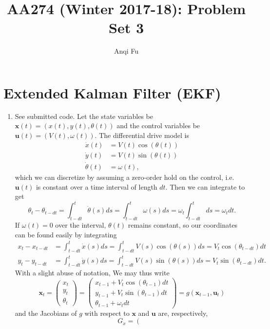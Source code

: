 \documentclass[12pt]{article}
\title{\Large{AA274 (Winter 2017-18): Problem Set 3}}
\author{Anqi Fu}
\begin{document}
\maketitle

\section{Extended Kalman Filter (EKF)}
\begin{enumerate}
	\item See submitted code. Let the state variables be $\mathbf{x}(t) = (x(t), y(t), \theta(t))$ and the control variables be $\mathbf{u}(t) = (V(t), \omega(t))$. The differential drive model is
	\begin{align*}
		\dot x(t) &= V(t)\cos(\theta(t)) \\
		\dot y(t) &= V(t)\sin(\theta(t)) \\
		\dot \theta(t) &= \omega(t),
	\end{align*}
	which we can discretize by assuming a zero-order hold on the control, i.e. $\mathbf{u}(t)$ is constant over a time interval of length $dt$. Then we can integrate to get
	\[
		\theta_t - \theta_{t-dt} = \int_{t-dt}^t \dot \theta(s)ds = \int_{t-dt}^t \omega(s)ds = \omega_t\int_{t-dt}^tds = \omega_tdt.
	\]
	If $\omega(t) = 0$ over the interval, $\theta(t)$ remains constant, so our coordinates can be found easily by integrating
	\begin{align*}
		x_t - x_{t-dt} &= \int_{t-dt}^t \dot x(s)ds = \int_{t-dt}^t V(s)\cos(\theta(s))ds = V_t\cos(\theta_{t-dt})dt \\
		y_t - y_{t-dt} &= \int_{t-dt}^t \dot y(s)ds = \int_{t-dt}^t V(s)\sin(\theta(s))ds = V_t\sin(\theta_{t-dt})dt.
	\end{align*}
	With a slight abuse of notation, We may thus write
	\[
		\mathbf{x}_t = \left(\begin{array}{c}
		x_t \\
		y_t \\
		\theta_t\end{array}\right) = \left(\begin{array}{c}
		x_{t-1} + V_t\cos(\theta_{t-1})dt \\
		y_{t-1} + V_t\sin(\theta_{t-1})dt \\
		\theta_{t-1} + \omega_tdt
		\end{array}\right) = g(\mathbf{x}_{t-1}, \mathbf{u}_t)
	\]
	and the Jacobians of $g$ with respect to $\mathbf{x}$ and $\mathbf{u}$ are, respectively,
	\[
		G_x = \left(\begin{array}{ccc}

\end{array}\]
\end{enumerate}
\end{document}
